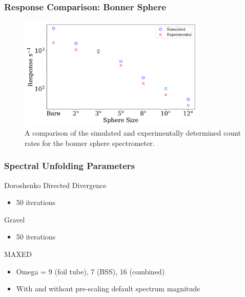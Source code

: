 \documentclass[fleqn]{beamer}
\begin{document}
\begin{frame}
\frametitle{Response Comparison: Bonner Sphere}

\begin{figure}
\centering
\includegraphics[width = 0.8\textwidth]{compare_countrates}
\caption{A comparison of the simulated and experimentally determined count rates for the bonner sphere spectrometer.}
\end{figure}

\end{frame}

\begin{frame}
\frametitle{Spectral Unfolding Parameters}

Doroshenko Directed Divergence
\begin{itemize}
\item 50 iterations
\end{itemize}

Gravel
\begin{itemize}
\item 50 iterations
\end{itemize}

MAXED
\begin{itemize}
\item Omega = 9 (foil tube), 7 (BSS), 16 (combined)
\item With and without pre-scaling default spectrum magnitude
\end{itemize}

\end{frame}
\end{document}
